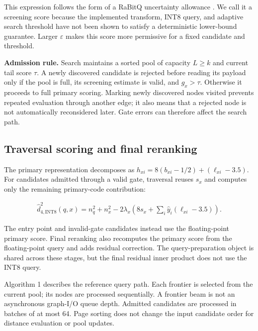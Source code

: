 This expression follows the form of a RaBitQ uncertainty allowance \cite{rabitq}. We call it a screening score because the implemented transform, INT8 query, and adaptive search threshold have not been shown to satisfy a deterministic lower-bound guarantee. Larger $\varepsilon$ makes this score more permissive for a fixed candidate and threshold.

\textbf{Admission rule.} Search maintains a sorted pool of capacity $L\geq k$ and current tail score $\tau$. A newly discovered candidate is rejected before reading its payload only if the pool is full, its screening estimate is valid, and $g_x>\tau$. Otherwise it proceeds to full primary scoring. Marking newly discovered nodes visited prevents repeated evaluation through another edge; it also means that a rejected node is not automatically reconsidered later. Gate errors can therefore affect the search path.

\subsection{Traversal scoring and final reranking}

The primary representation decomposes as $h_{xi}=8(b_{xi}-1/2)+(\ell_{xi}-3.5)$. For candidates admitted through a valid gate, traversal reuses $s_x$ and computes only the remaining primary-code contribution:

\begin{equation}
\begin{gathered}
\widehat d_{4,\mathrm{INT8}}^2(q,x)=n_q^2+n_x^2-2\lambda_x
\left(8s_x+\sum_i\widehat y_i(\ell_{xi}-3.5)\right).
\end{gathered}
\end{equation}

The entry point and invalid-gate candidates instead use the floating-point primary score. Final reranking also recomputes the primary score from the floating-point query and adds residual correction. The query-preparation object is shared across these stages, but the final residual inner product does not use the INT8 query.

Algorithm 1 describes the reference query path. Each frontier is selected from the current pool; its nodes are processed sequentially. A frontier beam is not an asynchronous graph-I/O queue depth. Admitted candidates are processed in batches of at most 64. Page sorting does not change the input candidate order for distance evaluation or pool updates.

